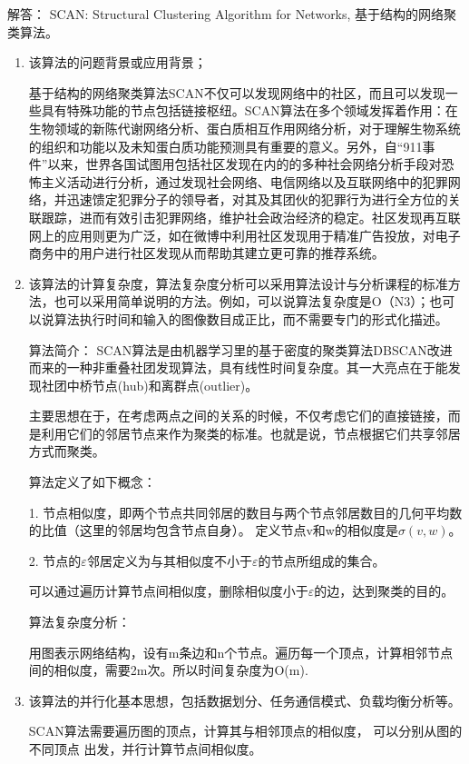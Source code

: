 \documentclass{ctexart}
\begin{document}
{\heiti 解答：}
SCAN: Structural Clustering Algorithm for Networks,  基于结构的网络聚类算法。
\begin{enumerate}[label=(\alph*)]
    \item 该算法的问题背景或应用背景；

        基于结构的网络聚类算法SCAN不仅可以发现网络中的社区，而且可以发现一些具有特殊功能的节点包括链接枢纽。SCAN算法在多个领域发挥着作用：在生物领域的新陈代谢网络分析、蛋白质相互作用网络分析，对于理解生物系统的组织和功能以及未知蛋白质功能预测具有重要的意义。另外，自“911事件”以来，世界各国试图用包括社区发现在内的的多种社会网络分析手段对恐怖主义活动进行分析，通过发现社会网络、电信网络以及互联网络中的犯罪网络，并迅速馈定犯罪分子的领导者，对其及其团伙的犯罪行为进行全方位的关联跟踪，进而有效引击犯罪网络，维护社会政治经济的稳定。社区发现再互联网上的应用则更为广泛，如在微博中利用社区发现用于精准广告投放，对电子商务中的用户进行社区发现从而帮助其建立更可靠的推荐系统。
    \item 该算法的计算复杂度，算法复杂度分析可以采用算法设计与分析课程的标准方法，也可以采用简单说明的方法。例如，可以说算法复杂度是O（N3）；也可以说算法执行时间和输入的图像数目成正比，而不需要专门的形式化描述。

        算法简介：
        SCAN算法是由机器学习里的基于密度的聚类算法DBSCAN改进而来的一种非重叠社团发现算法，具有线性时间复杂度。其一大亮点在于能发现社团中桥节点(hub)和离群点(outlier)。

        主要思想在于，在考虑两点之间的关系的时候，不仅考虑它们的直接链接，而是利用它们的邻居节点来作为聚类的标准。也就是说，节点根据它们共享邻居方式而聚类。 

        算法定义了如下概念：

        1. 节点相似度，即两个节点共同邻居的数目与两个节点邻居数目的几何平均数的比值（这里的邻居均包含节点自身）。
        定义节点v和w的相似度是$\sigma(v,w)$。
        
        2. 节点的$\varepsilon$邻居定义为与其相似度不小于$\varepsilon$的节点所组成的集合。 

        可以通过遍历计算节点间相似度，删除相似度小于$\varepsilon$的边，达到聚类的目的。

        算法复杂度分析：

        用图表示网络结构，设有m条边和n个节点。遍历每一个顶点，计算相邻节点
        间的相似度，需要2m次。所以时间复杂度为O(m).


    \item 该算法的并行化基本思想，包括数据划分、任务通信模式、负载均衡分析等。

       SCAN算法需要遍历图的顶点，计算其与相邻顶点的相似度，
        可以分别从图的不同顶点
        出发，并行计算节点间相似度。
\end{enumerate}
\end{document}
